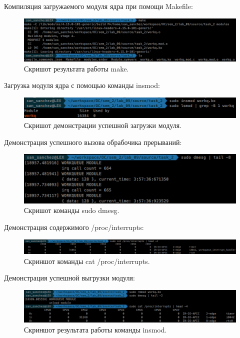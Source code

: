 Компиляция загружаемого модуля ядра при помощи Makefile:
\begin{figure}[H]
    \centering
    \includegraphics[scale=0.33]{data/image/ismod_workq.png}
    \caption{Скришот результата работы make.}
\end{figure}

Загрузка модуля ядра с помощью команды insmod:
\begin{figure}[H]
    \centering
    \includegraphics[scale=0.4]{data/image/issmod_work.png}
    \caption{Скришот демонстрации успешной загрузки модуля.}
\end{figure}


Демонстрация успешного вызова обрабочика прерываний:
\begin{figure}[H]
    \centering
    \includegraphics[scale=0.37]{data/image/work.png}
    \caption{Скришот команды sudo dmesg.}
\end{figure}

Демонстрация содержимого /proc/interrupts:
\begin{figure}[H]
    \centering
    \includegraphics[scale=0.29]{data/image/cat_workq.png}
    \caption{Скриншот команды cat /proc/interrupts.}
\end{figure}

Демонстрация успешной выгрузки модуля:
\begin{figure}[H]
    \centering
    \includegraphics[scale=0.35]{data/image/end.png}
    \caption{Скриншот результата работы команды insmod.}
\end{figure}
